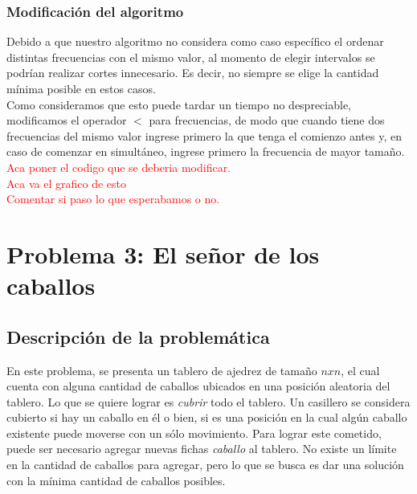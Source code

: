 \documentclass[a4paper]{article}
\begin{document}
\newpage
\subsubsection{Modificaci\'on del algoritmo}
Debido a que nuestro algoritmo no considera como caso espec\'ifico el ordenar distintas frecuencias con el mismo valor, al momento de elegir intervalos se podr\'ian realizar cortes innecesario. Es decir, no siempre se elige la cantidad m\'inima posible en estos casos.\\

Como consideramos que esto puede tardar un tiempo no despreciable, modificamos el operador $<$ para frecuencias, de modo que cuando tiene dos frecuencias del mismo valor ingrese primero la que tenga el comienzo antes y, en caso de comenzar en simult\'aneo, ingrese primero la frecuencia de mayor tama\~no.\\

\textcolor{red}{Aca poner el codigo que se deberia modificar.}\\

\textcolor{red}{Aca va el grafico de esto}\\

\textcolor{red}{Comentar si paso lo que esperabamos o no.}


\newpage



\section{Problema 3: El se\~nor de los caballos}
\subsection{Descripci\'on de la problem\'atica}

En este problema, se presenta un tablero de ajedrez de tama\~no $nxn$, el cual cuenta con alguna cantidad de caballos ubicados en una posici\'on aleatoria del tablero. Lo que se quiere lograr es \emph{cubrir} todo el tablero. Un casillero se considera cubierto si hay un caballo en \'el o bien, si es una posici\'on en la cual alg\'un caballo existente puede moverse con un s\'olo movimiento. Para lograr este cometido, puede ser necesario agregar nuevas fichas \emph{caballo} al tablero. No existe un l\'imite en la cantidad de caballos para agregar, pero lo que se busca es dar una soluci\'on con la m\'inima cantidad de caballos posibles.\\
\end{document}
